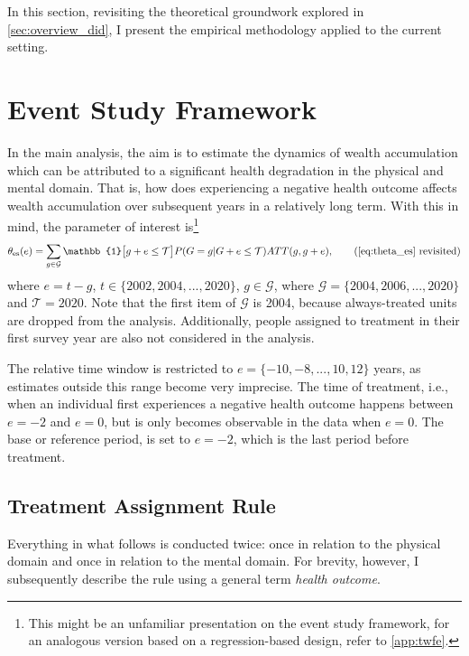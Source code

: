 
In this section, revisiting the theoretical groundwork explored in \cref{sec:overview_did}, I
present the empirical methodology applied to the current setting.

\section{Event Study Framework}
\label{sec:empir_event_study}

In the main analysis, the aim is to estimate the dynamics of wealth accumulation which can be
attributed to a significant health degradation in the physical and mental domain. That is, how does
experiencing a negative health outcome affects wealth accumulation over subsequent years in a
relatively long term. With this in mind, the parameter of interest is\footnote{This might be an
    unfamiliar presentation on the event study framework, for an analogous version based on a regression-based design,
    refer to \cref{app:twfe}.} %
\begin{equation}
    \theta_\text{es}(e) = \sum_{g \in \mathcal{G}} \mathbb{1}\big[ g + e \leq \mathcal{T} \big] P(G=g|G+e \leq \mathcal{T}) ATT(g,g+e), 
    \tag{\ref{eq:theta_es} revisited}
    \label{eq:theta_es2}
\end{equation}
%
where $e = t-g$, $t \in \{2002, 2004, ..., 2020\}$,  $g \in \mathcal{G}$, where $\mathcal{G} = \{2004, 2006,
..., 2020\}$ and $\mathcal{T}=2020$. Note that the first item of $\mathcal{G}$ is 2004, because always-treated
units are dropped from the analysis. Additionally, people assigned to treatment in their first survey
year are also not considered in the analysis.

The relative time window is restricted to $e=\{-10,-8,...,10,12\}$ years, as estimates outside this range
become very imprecise. The time of treatment, i.e., when an individual first experiences a negative health
outcome happens between $e=-2$ and $e=0$, but is only becomes observable in the data when $e=0$. The base or
reference period, is set to $e=-2$, which is the last period before treatment.


\subsection{Treatment Assignment Rule}
\label{sec:treatassigrule}

Everything in what follows is conducted twice: once in relation to the physical domain and once in relation to
the mental domain. For brevity, however, I subsequently describe the rule using a general term
\textit{health outcome}.

